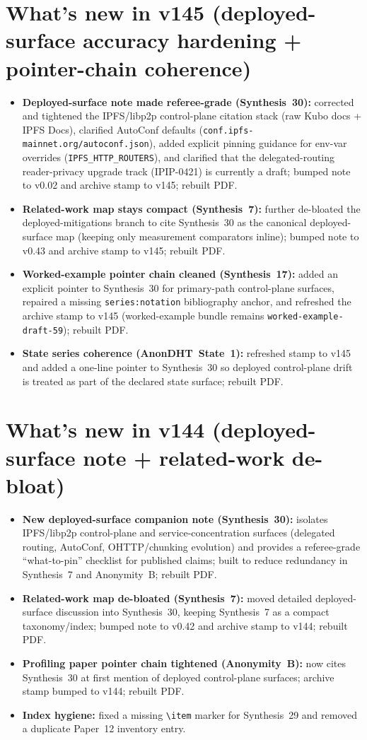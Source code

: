\documentclass[11pt]{article}
\begin{document}
\section{What's new in v145 (deployed-surface accuracy hardening + pointer-chain coherence)}
\begin{itemize}[leftmargin=*]
\item \textbf{Deployed-surface note made referee-grade (Synthesis~30):} corrected and tightened the IPFS/libp2p control-plane citation stack (raw Kubo docs + IPFS Docs), clarified AutoConf defaults (\texttt{conf.ipfs-mainnet.org/autoconf.json}), added explicit pinning guidance for env-var overrides (\texttt{IPFS\_HTTP\_ROUTERS}), and clarified that the delegated-routing reader-privacy upgrade track (IPIP-0421) is currently a draft; bumped note to v0.02 and archive stamp to v145; rebuilt PDF.
\item \textbf{Related-work map stays compact (Synthesis~7):} further de-bloated the deployed-mitigations branch to cite Synthesis~30 as the canonical deployed-surface map (keeping only measurement comparators inline); bumped note to v0.43 and archive stamp to v145; rebuilt PDF.
\item \textbf{Worked-example pointer chain cleaned (Synthesis~17):} added an explicit pointer to Synthesis~30 for primary-path control-plane surfaces, repaired a missing \texttt{series:notation} bibliography anchor, and refreshed the archive stamp to v145 (worked-example bundle remains \texttt{worked-example-draft-59}); rebuilt PDF.
\item \textbf{State series coherence (AnonDHT~State~1):} refreshed stamp to v145 and added a one-line pointer to Synthesis~30 so deployed control-plane drift is treated as part of the declared state surface; rebuilt PDF.
\end{itemize}

\section{What's new in v144 (deployed-surface note + related-work de-bloat)}
\begin{itemize}[leftmargin=*]
\item \textbf{New deployed-surface companion note (Synthesis~30):} isolates IPFS/libp2p control-plane and service-concentration surfaces (delegated routing, AutoConf, OHTTP/chunking evolution) and provides a referee-grade ``what-to-pin'' checklist for published claims; built to reduce redundancy in Synthesis~7 and Anonymity~B; rebuilt PDF.
\item \textbf{Related-work map de-bloated (Synthesis~7):} moved detailed deployed-surface discussion into Synthesis~30, keeping Synthesis~7 as a compact taxonomy/index; bumped note to v0.42 and archive stamp to v144; rebuilt PDF.
\item \textbf{Profiling paper pointer chain tightened (Anonymity~B):} now cites Synthesis~30 at first mention of deployed control-plane surfaces; archive stamp bumped to v144; rebuilt PDF.
\item \textbf{Index hygiene:} fixed a missing \texttt{\textbackslash item} marker for Synthesis~29 and removed a duplicate Paper~12 inventory entry.
\end{itemize}
\end{document}
